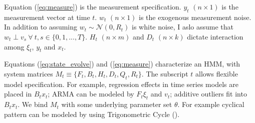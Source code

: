 \documentclass[12pt]{article}
\numberwithin{equation}{section}
\begin{document}
Equation (\ref{eq:measure}) is the measurement specification. $y_t$ $(n\times 1)$ is the measurement vector at time $t$. $w_t$ $(n\times 1)$ is the exogenous measurement noise. In addition to assuming $w_t\sim \mathcal{N}(0, R_t)$ is white noise, I aslo assume that  $w_t \perp v_s \ \forall\  t,s\in\{0,1,...,T\}$. $H_t$ $(n\times m)$ and $D_t$ $(n\times k)$ dictate interaction among $\xi_t$, $y_t$ and $x_t$. 

Equations (\ref{eq:state_evolve}) and (\ref{eq:measure}) characterize an HMM, with system matrices $M_t\equiv\{F_t, B_t, H_t, D_t, Q_t, R_t\}$. The subscript $t$ allows flexible model specification. For example, regression effects in time series models are placed in $B_t x_t$; ARMA can be modeled by $F_t\xi_t$ and $v_t$; additive outliers fit into $B_t x_t$. We bind $M_t$ with some underlying parameter set $\theta$. For example cyclical pattern can be modeled by using Trigonometric Cycle (\cite{harvey_1985}).  
\end{document}
